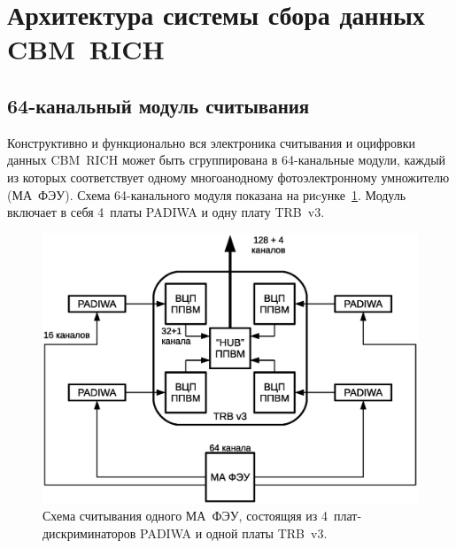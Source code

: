 \section{Архитектура системы сбора данных CBM~RICH}\label{section:secReadout}

\subsection{64-канальный модуль считывания}\label{section:secModule}

Конструктивно и функционально вся электроника считывания и оцифровки данных CBM~RICH может быть сгруппирована в 64-канальные модули, каждый из которых соответствует одному многоанодному фотоэлектронному умножителю (МА~ФЭУ). Схема 64-канального модуля показана на риcунке~\ref{fig:ReadoutModule}. Модуль включает в себя 4~платы PADIWA и одну плату TRB~v3.

\begin{figure}
\includegraphics[width=1.0\textwidth]{pictures/4_A_PMT_readout_rus.eps}
\caption{Схема считывания одного МА~ФЭУ, состоящяя из 4~плат-дискриминаторов PADIWA и одной платы TRB~v3.}
\label{fig:ReadoutModule}
\end{figure}

